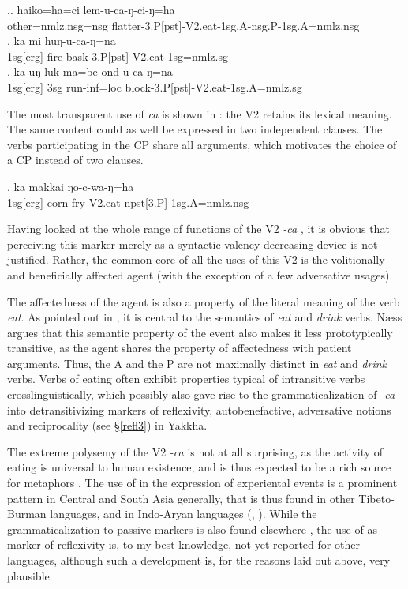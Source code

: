 \ex.\ag. haiko=ha=ci lem-u-ca-ŋ-ci-ŋ=ha\\
other{\sc =nmlz.nsg=nsg} flatter{\sc -3.P[pst]-V2.eat-1sg.A-nsg.P-1sg.A=nmlz.nsg}\\
\bg. ka mi huŋ-u-ca-ŋ=na\\
{\sc 1sg[erg]} fire bask{\sc -3.P[pst]-V2.eat-1sg=nmlz.sg}\\
\bg. ka uŋ luk-ma=be ond-u-ca-ŋ=na\\
{\sc 1sg[erg]} {\sc 3sg} run{\sc -inf=loc} block{\sc -3.P[pst]-V2.eat-1sg.A=nmlz.sg}\\

The most transparent use of \emph{ca} is shown in \Next: the V2 retains its lexical meaning. The same content could as well be expressed in two independent clauses. The verbs participating in the CP share all arguments, which motivates the choice of a CP instead of two clauses. 

\exg. ka makkai ŋo-c-wa-ŋ=ha\\
{\sc 1sg[erg]} corn fry{\sc -V2.eat-npst[3.P]-1sg.A=nmlz.nsg}\\


Having looked at the whole range of functions of the V2 \emph{-ca} , it is obvious that perceiving this marker merely as a syntactic valency-decreasing device is not justified. Rather, the common core of all the uses of this V2  is the volitionally and beneficially affected agent (with the exception of a few adversative usages). 

The affectedness of the agent is also a property of the literal meaning of the verb \emph{eat}. As pointed out in  \citet[37]{Naess2009_How}, it is central to the semantics of \emph{eat} and \emph{drink} verbs. Næss argues that this semantic property of the event also makes it less prototypically transitive, as the agent shares the property of affectedness with patient arguments. Thus, the A and the P are not maximally distinct in \emph{eat} and \emph{drink} verbs. Verbs of eating often exhibit properties typical of intransitive verbs crosslinguistically, which possibly also gave rise to the grammaticalization of \emph{-ca} into detransitivizing markers of reflexivity, autobenefactive, adversative notions  and reciprocality (see §\ref{refl3}) in Yakkha. 

The extreme polysemy of the V2 \emph{-ca} is not at all surprising, as the activity of eating is universal to human existence, and is thus expected to be a rich source for metaphors \citep{Newman2009_A-cross-linguistic}. The use of  in the expression of experiental events is a prominent pattern in Central and South Asia generally, that is thus found in other Tibeto-Burman languages, and in Indo-Aryan languages (\citealt[154]{Hooketal2009_The-semantic}, \citealt{Pramodini2010_Eat}). While the grammaticalization to passive markers is also found elsewhere \citep[122]{Heineetal2002_World}, the use of  as marker of reflexivity is, to my best knowledge, not yet reported for other languages, although such a development is, for the reasons laid out above, very plausible.


